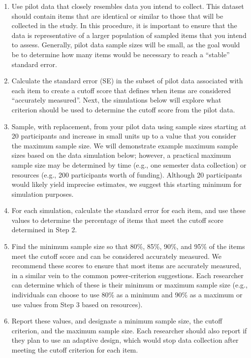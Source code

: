 \documentclass[
  man]{apa7}
\begin{document}
\begin{enumerate}
\def\labelenumi{\arabic{enumi})}
\item
  Use pilot data that closely resembles data you intend to collect. This dataset should contain items that are identical or similar to those that will be collected in the study. In this procedure, it is important to ensure that the data is representative of a larger population of sampled items that you intend to assess. Generally, pilot data sample sizes will be small, as the goal would be to determine how many items would be necessary to reach a ``stable'' standard error.
\item
  Calculate the standard error (SE) in the subset of pilot data associated with each item to create a cutoff score that defines when items are considered ``accurately measured''. Next, the simulations below will explore what criterion should be used to determine the cutoff score from the pilot data.
\item
  Sample, with replacement, from your pilot data using sample sizes starting at 20 participants and increase in small units up to a value that you consider the maximum sample size. We will demonstrate example maximum sample sizes based on the data simulation below; however, a practical maximum sample size may be determined by time (e.g., one semester data collection) or resources (e.g., 200 participants worth of funding). Although 20 participants would likely yield imprecise estimates, we suggest this starting minimum for simulation purposes.
\item
  For each simulation, calculate the standard error for each item, and use these values to determine the percentage of items that meet the cutoff score determined in Step 2.
\item
  Find the minimum sample size so that 80\%, 85\%, 90\%, and 95\% of the items meet the cutoff score and can be considered accurately measured. We recommend these scores to ensure that most items are accurately measured, in a similar vein to the common power-criterion suggestions. Each researcher can determine which of these is their minimum or maximum sample size (e.g., individuals can choose to use 80\% as a minimum and 90\% as a maximum or use values from Step 3 based on resources).
\item
  Report these values, and designate a minimum sample size, the cutoff criterion, and the maximum sample size. Each researcher should also report if they plan to use an adaptive design, which would stop data collection after meeting the cutoff criterion for each item.
\end{enumerate}
\end{document}
